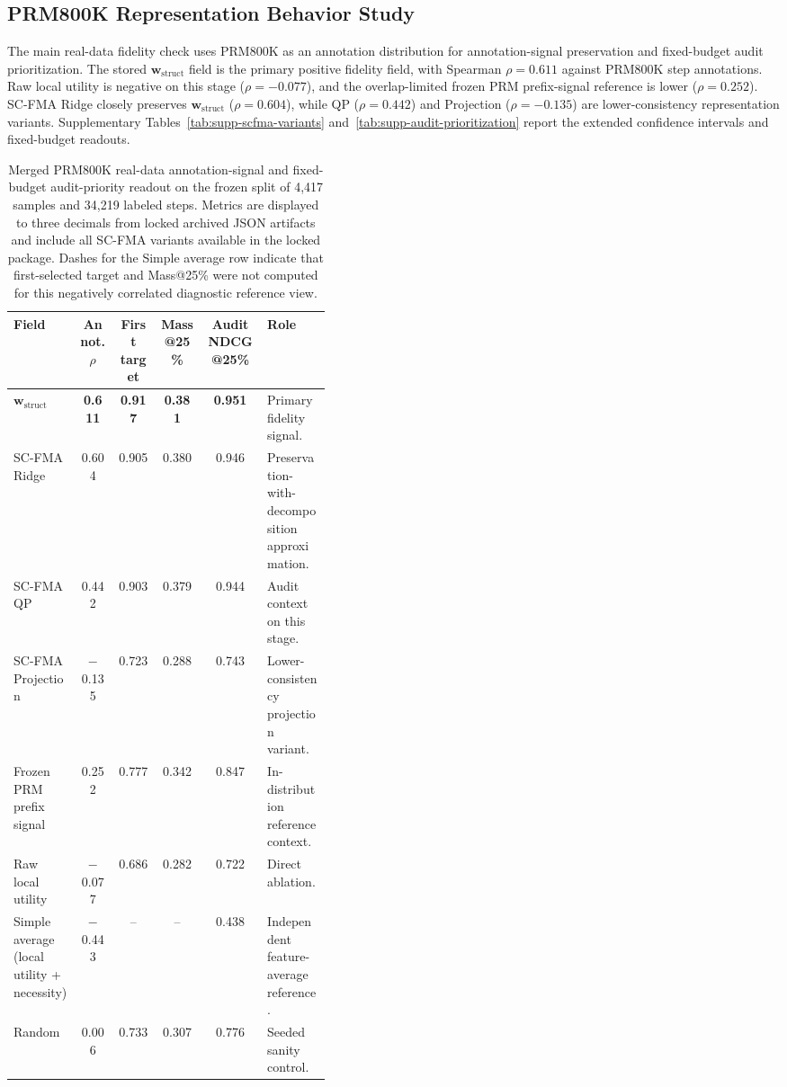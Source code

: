 \documentclass[a4paper,fleqn]{cas-sc}
\newcommand{\wstruct}{\ensuremath{\mathbf{w}_{\mathrm{struct}}}}
\begin{document}
\subsection{PRM800K Representation Behavior Study}
\label{sec:prm800k-evidence}

The main real-data fidelity check uses PRM800K as an annotation distribution for annotation-signal preservation and fixed-budget audit prioritization. The stored \wstruct{} field is the primary positive fidelity field, with Spearman $\rho = 0.611$ against PRM800K step annotations. Raw local utility is negative on this stage ($\rho = -0.077$), and the overlap-limited frozen PRM prefix-signal reference is lower ($\rho = 0.252$). SC-FMA Ridge closely preserves \wstruct{} ($\rho = 0.604$), while QP ($\rho = 0.442$) and Projection ($\rho = -0.135$) are lower-consistency representation variants. Supplementary Tables~\ref{tab:supp-scfma-variants} and~\ref{tab:supp-audit-prioritization} report the extended confidence intervals and fixed-budget readouts.

\begin{table}[ht]
\caption{Merged PRM800K real-data annotation-signal and fixed-budget audit-priority readout on the frozen split of 4,417 samples and 34,219 labeled steps. Metrics are displayed to three decimals from locked archived JSON artifacts and include all SC-FMA variants available in the locked package. Dashes for the Simple average row indicate that first-selected target and Mass@25\% were not computed for this negatively correlated diagnostic reference view.}
\label{tab:prm800k-audit}
\centering
\small
\renewcommand{\arraystretch}{1.08}
\begin{tabular}{Z{0.21\linewidth}ccccZ{0.20\linewidth}}
\toprule
\textbf{Field} & \textbf{Annot. $\rho$} & \textbf{First target} & \textbf{Mass@25\%} & \textbf{Audit NDCG@25\%} & \textbf{Role} \\
\midrule
\wstruct{} & \textbf{0.611} & \textbf{0.917} & \textbf{0.381} & \textbf{0.951} & Primary fidelity signal. \\
SC-FMA Ridge & 0.604 & 0.905 & 0.380 & 0.946 & Preservation-with-decomposition approximation. \\
SC-FMA QP & 0.442 & 0.903 & 0.379 & 0.944 & Audit context on this stage. \\
SC-FMA Projection & $-$0.135 & 0.723 & 0.288 & 0.743 & Lower-consistency projection variant. \\
Frozen PRM prefix signal & 0.252 & 0.777 & 0.342 & 0.847 & In-distribution reference context. \\
Raw local utility & $-$0.077 & 0.686 & 0.282 & 0.722 & Direct ablation. \\
Simple average (local utility + necessity) & $-$0.443 & -- & -- & 0.438 & Independent feature-average reference. \\
Random & 0.006 & 0.733 & 0.307 & 0.776 & Seeded sanity control. \\
\bottomrule
\end{tabular}
\end{table}
\end{document}
